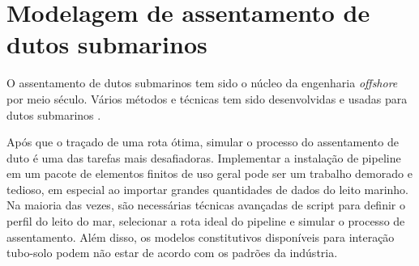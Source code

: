 \chapter{Modelagem de assentamento de dutos submarinos}
\label{chap:assentamento}

O assentamento de dutos submarinos tem sido o núcleo da engenharia \textit{offshore} por meio século. Vários métodos e técnicas tem sido desenvolvidas e usadas para dutos submarinos \cite[]{Ivi2016}.

Após que o traçado de uma rota ótima, simular o processo do assentamento de duto é uma das tarefas mais desafiadoras. Implementar a instalação de pipeline em um pacote de elementos finitos de uso geral pode ser um trabalho demorado e tedioso, em especial ao importar grandes quantidades de dados do leito marinho. Na maioria das vezes, são necessárias técnicas avançadas de script para definir o perfil do leito do mar, selecionar a rota ideal do pipeline e simular o processo de assentamento. Além disso, os modelos constitutivos disponíveis para interação tubo-solo podem não estar de acordo com os padrões da indústria.